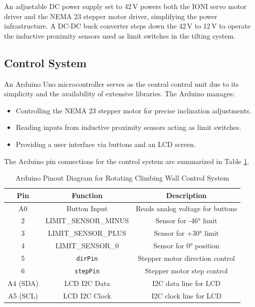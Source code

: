 An adjustable DC power supply set to 42\,V powers both the IONI servo motor driver and the NEMA 23 stepper motor driver, simplifying the power infrastructure. A DC-DC buck converter steps down the 42\,V to 12\,V to operate the inductive proximity sensors used as limit switches in the tilting system.

\subsection{Control System}

An Arduino Uno microcontroller serves as the central control unit due to its simplicity and the availability of extensive libraries. The Arduino manages:

\begin{itemize}
    \item Controlling the NEMA 23 stepper motor for precise inclination adjustments.
    \item Reading inputs from inductive proximity sensors acting as limit switches.
    \item Providing a user interface via buttons and an LCD screen.
\end{itemize}


The Arduino pin connections for the control system are summarized in Table \ref{tab:pinout}.

\begin{table}[h!]
\centering
\begin{tabular}{|c|c|c|}
\hline
\textbf{Pin} & \textbf{Function}          & \textbf{Description}                \\
\hline
A0           & Button Input               & Reads analog voltage for buttons    \\
2            & LIMIT\_SENSOR\_MINUS       & Sensor for -46° limit               \\
3            & LIMIT\_SENSOR\_PLUS        & Sensor for +30° limit               \\
4            & LIMIT\_SENSOR\_0           & Sensor for 0° position              \\
5            & \texttt{dirPin}            & Stepper motor direction control     \\
6            & \texttt{stepPin}           & Stepper motor step control          \\
A4 (SDA)     & LCD I2C Data               & I2C data line for LCD               \\
A5 (SCL)     & LCD I2C Clock              & I2C clock line for LCD              \\
\hline
\end{tabular}
\caption{Arduino Pinout Diagram for Rotating Climbing Wall Control System}
\label{tab:pinout}
\end{table}

